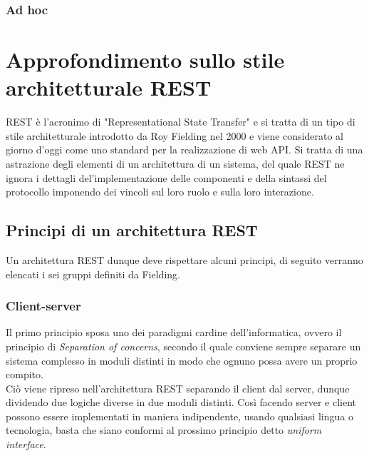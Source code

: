 \subsubsection*{Ad hoc}
\section{Approfondimento sullo stile architetturale REST}
REST è l'acronimo di "Representational State Transfer" e si tratta di un tipo di stile architetturale introdotto da Roy Fielding nel 2000 e viene considerato al giorno d'oggi come uno standard per la realizzazione di web API. Si tratta di una astrazione degli elementi di un architettura di un sistema, del quale REST ne ignora i dettagli del'implementazione delle componenti e della sintassi del protocollo imponendo dei vincoli sul loro ruolo e sulla loro interazione.
\subsection*{Principi di un architettura REST}
Un architettura REST dunque deve rispettare alcuni principi, di seguito verranno elencati i sei gruppi definiti da Fielding.
\subsubsection*{Client-server}
Il primo principio sposa uno dei paradigmi cardine dell'informatica, ovvero il principio di \textit{Separation of concerns}, secondo il quale conviene sempre separare un sistema complesso in moduli distinti in modo che ognuno possa avere un proprio compito.\\
Ciò viene ripreso nell'architettura REST separando il client dal server, dunque dividendo due logiche diverse in due moduli distinti. Così facendo server e client possono essere implementati in maniera indipendente, usando qualsiasi lingua o tecnologia, basta che siano conformi al prossimo principio detto \textit{uniform interface}.
